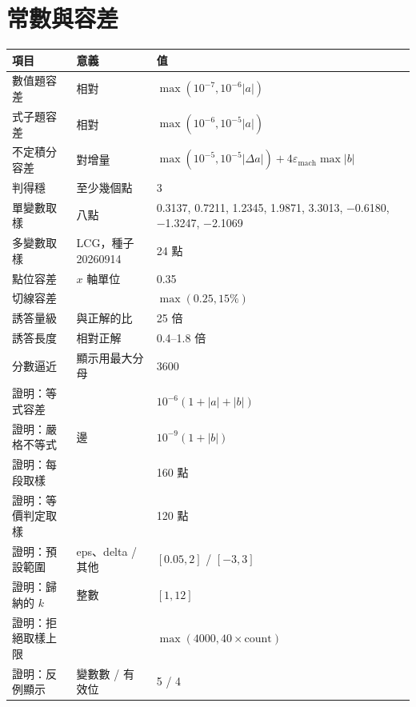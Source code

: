 \documentclass[11pt,a4paper,oneside]{book}
\renewcommand{\_}{\ifmmode\origunderscore\else\textunderscore\allowbreak\fi}
\begin{document}
\chapter{常數與容差}
\begin{table}[h]
\centering\small\sffamily
\begin{tabularx}{\textwidth}{@{}lYY@{}}
\toprule
項目 & 意義 & 值 \\
\midrule
數值題容差 & 相對 & $\max(10^{-7}, 10^{-6}|a|)$ \\
式子題容差 & 相對 & $\max(10^{-6}, 10^{-5}|a|)$ \\
不定積分容差 & 對增量 & $\max(10^{-5}, 10^{-5}|\Delta a|) + 4\varepsilon_{\text{mach}}\max|b|$ \\
判得穩 & 至少幾個點 & 3 \\
單變數取樣 & 八點 & 0.3137, 0.7211, 1.2345, 1.9871, 3.3013, −0.6180, −1.3247, −2.1069 \\
多變數取樣 & LCG，種子 20260914 & 24 點 \\
點位容差 & $x$ 軸單位 & 0.35 \\
切線容差 & & $\max(0.25, 15\%)$ \\
誘答量級 & 與正解的比 & 25 倍 \\
誘答長度 & 相對正解 & 0.4–1.8 倍 \\
分數逼近 & 顯示用最大分母 & 3600 \\
證明：等式容差 & & $10^{-6}(1+|a|+|b|)$ \\
證明：嚴格不等式 & 邊 & $10^{-9}(1+|b|)$ \\
證明：每段取樣 & & 160 點 \\
證明：等價判定取樣 & & 120 點 \\
證明：預設範圍 & eps、delta / 其他 & $[0.05, 2]$ / $[-3, 3]$ \\
證明：歸納的 $k$ & 整數 & $[1, 12]$ \\
證明：拒絕取樣上限 & & $\max(4000, 40\times\text{count})$ \\
證明：反例顯示 & 變數數 / 有效位 & 5 / 4 \\
\bottomrule
\end{tabularx}
\end{table}
\end{document}
